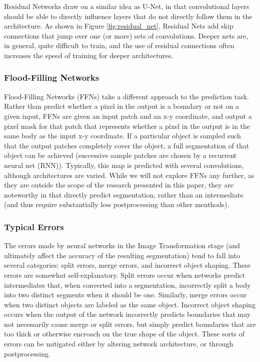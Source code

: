 Residual Networks draw on a similar idea as U-Net, in that convolutional layers should be able to directly influence layers that do not directly follow them in the architecture. As shown in Figure \ref{fig:residual_net}, Residual Nets add skip connections that jump over one (or more) sets of convolutions. Deeper nets are, in general, quite difficult to train, and the use of residual connections often increases the speed of training for deeper architectures.

\subsubsection{Flood-Filling Networks}
Flood-Filling Networks (FFNs) take a different approach to the prediction task. Rather than predict whether a pixel in the output is a boundary or not on a given input, FFNs are given an input patch and an x-y coordinate, and output a pixel mask for that patch that represents whether a pixel in the output is in the same body as the input x-y coordinate. If a particular object is sampled such that the output patches completely cover the object, a full segmentation of that object can be achieved (successive sample patches are chosen by a recurrent neural net (RNN)). Typically, this map is predicted with several convolutions, although architectures are varied. While we will not explore FFNs any further, as they are outside the scope of the research presented in this paper, they are noteworthy in that directly predict segmentation, rather than an intermediate (and thus require substantially less postprocessing than other menthods).


\subsubsection{Typical Errors}
The errors made by neural networks in the Image Transformation stage (and ultimately affect the accuracy of the resulting segmentation) tend to fall into several categories: split errors, merge errors, and incorrect object shaping. These errors are somewhat self-explanatory. Split errors occur when networks predict intermediates that, when converted into a segmentation, incorrectly split a body into two distinct segments when it should be one. Similarly, merge errors occur when two distinct objects are labeled as the same object. Incorrect object shaping occurs when the output of the network incorrectly predicts boundaries that may not necessarily cause merge or split errors, but simply predict boundaries that are too thick or otherwise encroach on the true shape of the object. These sorts of errors can be mitigated either by altering network architecture, or through postprocessing.

